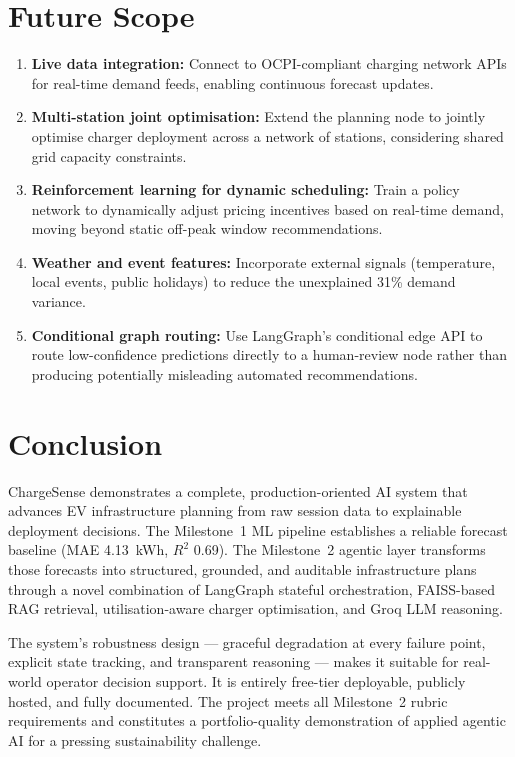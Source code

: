 \documentclass[12pt,a4paper]{article}
\begin{document}
\section{Future Scope}
\label{sec:future}

\begin{enumerate}[leftmargin=*, label=\textbf{F\arabic*.}]
  \item \textbf{Live data integration:} Connect to OCPI-compliant charging network
    APIs for real-time demand feeds, enabling continuous forecast updates.
  \item \textbf{Multi-station joint optimisation:} Extend the planning node to
    jointly optimise charger deployment across a network of stations, considering
    shared grid capacity constraints.
  \item \textbf{Reinforcement learning for dynamic scheduling:} Train a policy
    network to dynamically adjust pricing incentives based on real-time demand,
    moving beyond static off-peak window recommendations.
  \item \textbf{Weather and event features:} Incorporate external signals (temperature,
    local events, public holidays) to reduce the unexplained 31\% demand variance.
  \item \textbf{Conditional graph routing:} Use LangGraph's conditional edge API
    to route low-confidence predictions directly to a human-review node rather than
    producing potentially misleading automated recommendations.
\end{enumerate}

\section{Conclusion}
\label{sec:conclusion}

ChargeSense demonstrates a complete, production-oriented AI system that advances
EV infrastructure planning from raw session data to explainable deployment decisions.
The Milestone~1 ML pipeline establishes a reliable forecast baseline (MAE 4.13~kWh,
$R^2$ 0.69). The Milestone~2 agentic layer transforms those forecasts into structured,
grounded, and auditable infrastructure plans through a novel combination of LangGraph
stateful orchestration, FAISS-based RAG retrieval, utilisation-aware charger
optimisation, and Groq LLM reasoning.

The system's robustness design — graceful degradation at every failure point, explicit
state tracking, and transparent reasoning — makes it suitable for real-world operator
decision support. It is entirely free-tier deployable, publicly hosted, and fully
documented. The project meets all Milestone~2 rubric requirements and constitutes a
portfolio-quality demonstration of applied agentic AI for a pressing sustainability
challenge.
\end{document}
